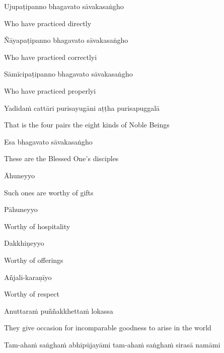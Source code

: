 Ujupaṭipanno bhagavato sāvakasaṅgho

\begin{cprenglish}
Who have practiced directly
\end{cprenglish}

Ñāyapaṭipanno bhagavato sāvakasaṅgho

\begin{cprenglish}
Who have practiced correctlyi
\end{cprenglish}

Sāmīcipaṭipanno bhagavato sāvakasaṅgho

\begin{cprenglish}
Who have practiced properlyi
\end{cprenglish}

Yadidaṁ cattāri purisayugāni aṭṭha purisapuggalā

\begin{cprenglish}
That is the four pairs the eight kinds of Noble Beings
\end{cprenglish}

Esa bhagavato sāvakasaṅgho

\begin{cprenglish}
These are the Blessed One’s disciples
\end{cprenglish}

Āhuneyyo

\begin{cprenglish}
Such ones are worthy of gifts
\end{cprenglish}

Pāhuneyyo

\begin{cprenglish}
Worthy of hospitality
\end{cprenglish}

Dakkhiṇeyyo

\begin{cprenglish}
Worthy of offerings
\end{cprenglish}

Añjali-karaṇīyo

\begin{cprenglish}
Worthy of respect
\end{cprenglish}

Anuttaraṁ puññakkhettaṁ lokassa

\begin{cprenglish}
They give occasion for incomparable goodness to arise in the world
\end{cprenglish}

Tam-ahaṁ saṅghaṁ abhipūjayāmi tam-ahaṁ saṅghaṁ sirasā namāmi

